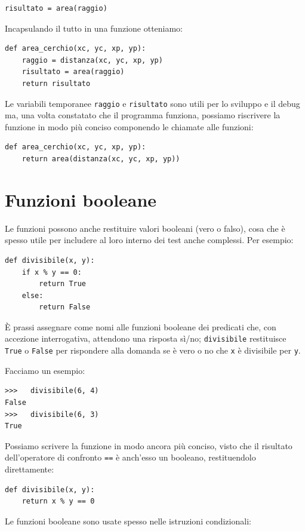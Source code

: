 \documentclass[10pt]{book}
\begin{document}
\begin{verbatim}
risultato = area(raggio)
\end{verbatim}
%
Incapsulando il tutto in una funzione otteniamo:

\begin{verbatim}
def area_cerchio(xc, yc, xp, yp):
    raggio = distanza(xc, yc, xp, yp)
    risultato = area(raggio)
    return risultato
\end{verbatim}
%
Le variabili temporanee {\tt raggio} e {\tt risultato} sono utili per lo sviluppo
e il debug ma, una volta constatato che il programma funziona, possiamo riscrivere la funzione in modo più conciso componendo le chiamate alle funzioni:

\begin{verbatim}
def area_cerchio(xc, yc, xp, yp):
    return area(distanza(xc, yc, xp, yp))
\end{verbatim}
%

\section{Funzioni booleane}
\label{boolean}

Le funzioni possono anche restituire valori booleani (vero o falso), cosa che è spesso utile per includere al loro interno dei test anche complessi.  
Per esempio:

\begin{verbatim}
def divisibile(x, y):
    if x % y == 0:
        return True
    else:
        return False
\end{verbatim}
%
È prassi assegnare come nomi alle funzioni booleane dei predicati che, con accezione interrogativa, attendono una risposta sì/no; \verb"divisibile" restituisce {\tt True} o {\tt False} per rispondere alla domanda se è vero o no che {\tt x} è divisibile per {\tt y}.

Facciamo un esempio:

\begin{verbatim}
>>>   divisibile(6, 4)
False
>>>   divisibile(6, 3)
True
\end{verbatim}
%
Possiamo scrivere la funzione in modo ancora più conciso, visto che il risultato dell'operatore di confronto {\tt ==} è anch'esso un booleano, restituendolo direttamente:

\begin{verbatim}
def divisibile(x, y):
    return x % y == 0
\end{verbatim}
%
Le funzioni booleane sono usate spesso nelle istruzioni condizionali:
\end{document}
